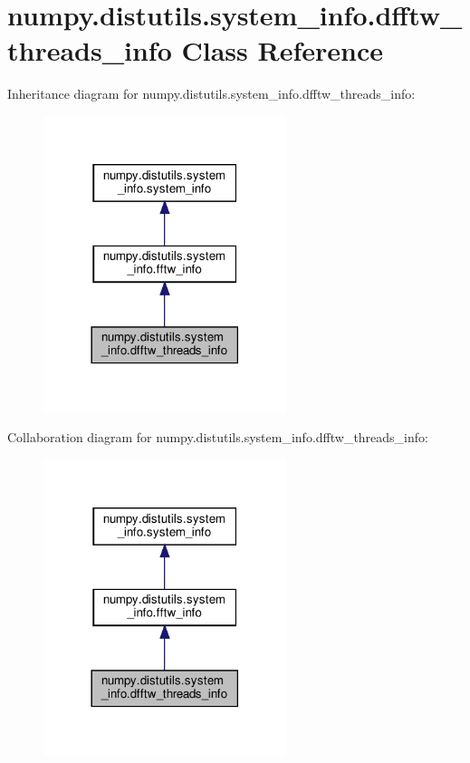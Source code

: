 \hypertarget{classnumpy_1_1distutils_1_1system__info_1_1dfftw__threads__info}{}\section{numpy.\+distutils.\+system\+\_\+info.\+dfftw\+\_\+threads\+\_\+info Class Reference}
\label{classnumpy_1_1distutils_1_1system__info_1_1dfftw__threads__info}


Inheritance diagram for numpy.\+distutils.\+system\+\_\+info.\+dfftw\+\_\+threads\+\_\+info\+:
\nopagebreak
\begin{figure}[H]
\begin{center}
\leavevmode
\includegraphics[width=201pt]{classnumpy_1_1distutils_1_1system__info_1_1dfftw__threads__info__inherit__graph}
\end{center}
\end{figure}


Collaboration diagram for numpy.\+distutils.\+system\+\_\+info.\+dfftw\+\_\+threads\+\_\+info\+:
\nopagebreak
\begin{figure}[H]
\begin{center}
\leavevmode
\includegraphics[width=201pt]{classnumpy_1_1distutils_1_1system__info_1_1dfftw__threads__info__coll__graph}
\end{center}
\end{figure}
